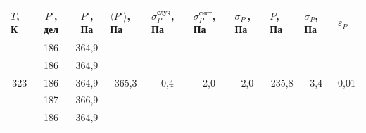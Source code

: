 \documentclass[a4paper,12pt]{article}
\begin{document}
\begin{table}[H]
\begin{tabular}{|c|c|c|c|c|c|c|c|c|c|}
\hline
\multicolumn{1}{|l|}{$ T $, К} & $ P' $, дел & $ P' $, Па & \multicolumn{1}{l|}{$ \langle P' \rangle $, Па} & \multicolumn{1}{l|}{$\sigma_P^{случ}$, Па} & \multicolumn{1}{l|}{$\sigma_P^{сист}$, Па} & \multicolumn{1}{l|}{$ \sigma_{P'} $, Па} & \multicolumn{1}{l|}{$ P $, Па} & \multicolumn{1}{l|}{$ \sigma_P $, Па} & \multicolumn{1}{l|}{$\varepsilon_P$} \\ \hline
\multirow{5}{*}{323}           & 186         & 364,9      & \multirow{5}{*}{365,3}                          & \multirow{5}{*}{0,4}                       & \multirow{5}{*}{2,0}                       & \multirow{5}{*}{2,0}                     & \multirow{5}{*}{235,8}         & \multirow{5}{*}{3,4}                  & \multirow{5}{*}{0,01}                 \\ \cline{2-3}
                               & 186         & 364,9      &                                                 &                                            &                                            &                                          &                                &                                       &                                      \\ \cline{2-3}
                               & 186         & 364,9      &                                                 &                                            &                                            &                                          &                                &                                       &                                      \\ \cline{2-3}
                               & 187         & 366,9      &                                                 &                                            &                                            &                                          &                                &                                       &                                      \\ \cline{2-3}
                               & 186         & 364,9      &                                                 &                                            &                                            &                                          &                                &                                       &                                      \\ \hline
\end{tabular}
\end{table}
\end{document}
